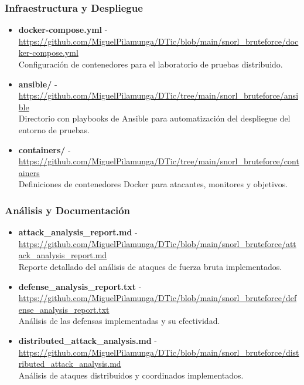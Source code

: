 \subsubsection*{Infraestructura y Despliegue}
\begin{itemize}
    \item \textbf{docker-compose.yml} - \url{https://github.com/MiguelPilamunga/DTic/blob/main/snorl_bruteforce/docker-compose.yml} \\
    Configuración de contenedores para el laboratorio de pruebas distribuido.
    
    \item \textbf{ansible/} - \url{https://github.com/MiguelPilamunga/DTic/tree/main/snorl_bruteforce/ansible} \\
    Directorio con playbooks de Ansible para automatización del despliegue del entorno de pruebas.
    
    \item \textbf{containers/} - \url{https://github.com/MiguelPilamunga/DTic/tree/main/snorl_bruteforce/containers} \\
    Definiciones de contenedores Docker para atacantes, monitores y objetivos.
\end{itemize}

\subsubsection*{Análisis y Documentación}
\begin{itemize}
    \item \textbf{attack\_analysis\_report.md} - \url{https://github.com/MiguelPilamunga/DTic/blob/main/snorl_bruteforce/attack_analysis_report.md} \\
    Reporte detallado del análisis de ataques de fuerza bruta implementados.
    
    \item \textbf{defense\_analysis\_report.txt} - \url{https://github.com/MiguelPilamunga/DTic/blob/main/snorl_bruteforce/defense_analysis_report.txt} \\
    Análisis de las defensas implementadas y su efectividad.
    
    \item \textbf{distributed\_attack\_analysis.md} - \url{https://github.com/MiguelPilamunga/DTic/blob/main/snorl_bruteforce/distributed_attack_analysis.md} \\
    Análisis de ataques distribuidos y coordinados implementados.
\end{itemize}

